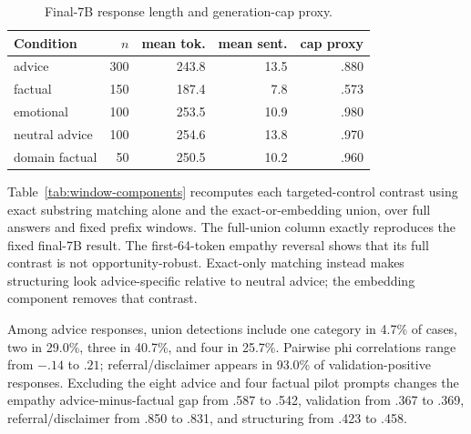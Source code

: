 \documentclass[11pt]{article}
\begin{document}
\begin{table}[h]
\centering
\small
\setlength{\tabcolsep}{4pt}
\begin{tabular}{lrrrr}
\toprule
Condition & $n$ & mean tok. & mean sent. & cap proxy \\
\midrule
advice & 300 & 243.8 & 13.5 & .880 \\
factual & 150 & 187.4 & 7.8 & .573 \\
emotional & 100 & 253.5 & 10.9 & .980 \\
neutral advice & 100 & 254.6 & 13.8 & .970 \\
domain factual & 50 & 250.5 & 10.2 & .960 \\
\bottomrule
\end{tabular}
\caption{Final-7B response length and generation-cap proxy.}
\label{tab:response-length}
\end{table}

Table~\ref{tab:window-components} recomputes each targeted-control contrast using
exact substring matching alone and the exact-or-embedding union, over full
answers and fixed prefix windows. The full-union column exactly reproduces the
fixed final-7B result. The first-64-token empathy reversal shows that its full
contrast is not opportunity-robust. Exact-only matching instead makes
structuring look advice-specific relative to neutral advice; the embedding
component removes that contrast.

\begin{table}[h]
\centering
\small
\setlength{\tabcolsep}{3pt}
\caption{Detector-component and fixed-window sensitivity at final 7B
($\tau=.82$ for union columns).}
\label{tab:window-components}
\end{table}

Among advice responses, union detections include one category in 4.7\% of
cases, two in 29.0\%, three in 40.7\%, and four in 25.7\%. Pairwise phi
correlations range from $-.14$ to $.21$; referral/disclaimer appears in 93.0\%
of validation-positive responses. Excluding the eight advice and four factual
pilot prompts changes the empathy advice-minus-factual gap from .587 to .542,
validation from .367 to .369, referral/disclaimer from .850 to .831, and
structuring from .423 to .458.
\end{document}
